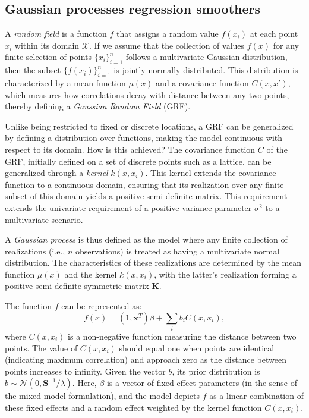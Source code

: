 \documentclass[
11pt, %
oneside, %
english, %
singlespacing, %
]{macthesis} %
\begin{document}
\subsection{Gaussian processes regression smoothers}\label{Gaussian-process-regression-smoothers}

A \emph{random field} is a function \(f\) that assigns a random value \(f(x_i)\) at each point \(x_i\) within its domain \(\mathcal{X}\). If we assume that the collection of values \(f(x)\) for any finite selection of points \(\{x_i\}_{i=1}^n\) follows a multivariate Gaussian distribution, then the subset \(\{f(x_i)\}_{i=1}^n\) is jointly normally distributed. This distribution is characterized by a mean function \(\mu(x)\) and a covariance function \(C(x, x')\), which measures how correlations decay with distance between any two points, thereby defining a \emph{Gaussian Random Field} (GRF).

Unlike being restricted to fixed or discrete locations, a GRF can be generalized by defining a distribution over functions, making the model continuous with respect to its domain. How is this achieved? The covariance function \(C\) of the GRF, initially defined on a set of discrete points such as a lattice, can be generalized through a \emph{kernel} \(k(x, x_i)\). This kernel extends the covariance function to a continuous domain, ensuring that its realization over any finite subset of this domain yields a positive semi-definite matrix. This requirement extends the univariate requirement of a positive variance parameter \(\sigma^2\) to a multivariate scenario.

A \emph{Gaussian process} is thus defined as the model where any finite collection of realizations (i.e., \(n\) observations) is treated as having a multivariate normal distribution. The characteristics of these realizations are determined by the mean function \(\mu(x)\) and the kernel \(k(x, x_i)\), with the latter's realization forming a positive semi-definite symmetric matrix \(\mathbf{K}\).

The function \(f\) can be represented as:
\[
f(x) = (1, \mathbf{x}^T)\beta + \sum_i b_i C(x, x_i),
\]
where \(C(x, x_i)\) is a non-negative function measuring the distance between two points. The value of \(C(x, x_i)\) should equal one when points are identical (indicating maximum correlation) and approach zero as the distance between points increases to infinity. Given the vector \(b\), its prior distribution is \(b \sim \mathcal{N}(0, \mathbf{S}^{-1}/\lambda)\). Here, \(\beta\) is a vector of fixed effect parameters (in the sense of the mixed model formulation), and the model depicts \(f\) as a linear combination of these fixed effects and a random effect weighted by the kernel function \(C(x, x_i)\).
\end{document}
